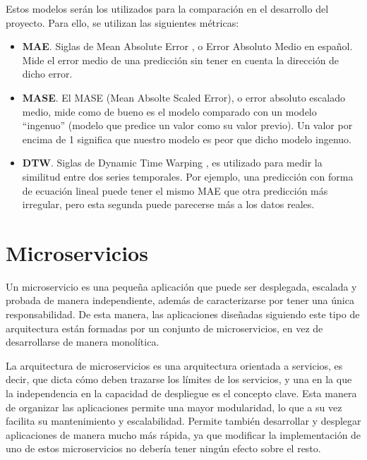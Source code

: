 Estos modelos serán los utilizados para la comparación en el desarrollo del proyecto. Para ello, se utilizan 
las siguientes métricas:
\begin{itemize}
    \item \textbf{MAE}. Siglas de Mean Absolute Error \cite{Botchkarev_2019}, o Error Absoluto Medio en español. Mide el error medio
        de una predicción sin tener en cuenta la dirección de dicho error.
    \item \textbf{MASE}. El MASE \cite{hyndman2006another} (Mean Absolte Scaled Error), o error absoluto escalado medio, mide como de bueno es 
        el modelo comparado con un modelo ``ingenuo'' (modelo que predice un valor como su valor previo). Un valor 
        por encima de 1 significa que nuestro modelo es peor que dicho modelo ingenuo.
    \item \textbf{DTW}. Siglas de Dynamic Time Warping \cite{Müller2007}, es utilizado para medir la similitud entre dos series temporales. Por ejemplo, una predicción 
        con forma de ecuación lineal puede tener el mismo MAE que otra predicción más irregular, pero esta segunda 
        puede parecerse más a los datos reales.
\end{itemize}

\section{Microservicios}

Un microservicio es una pequeña aplicación que puede ser desplegada, escalada y probada de manera independiente,
además de caracterizarse por tener una única responsabilidad. De esta manera, las aplicaciones diseñadas siguiendo 
este tipo de arquitectura están formadas por un conjunto de microservicios, en vez de desarrollarse de manera monolítica.

La arquitectura de microservicios es una arquitectura orientada a servicios, es decir, que dicta cómo deben trazarse los 
límites de los servicios, y una en la que la independencia en la capacidad de despliegue es el concepto clave.
Esta manera de organizar las aplicaciones permite una mayor modularidad, lo que a su vez facilita su mantenimiento 
y escalabilidad. Permite también desarrollar y desplegar aplicaciones de manera mucho más rápida, ya que modificar 
la implementación de uno de estos microservicios no debería tener ningún efecto sobre el resto.

